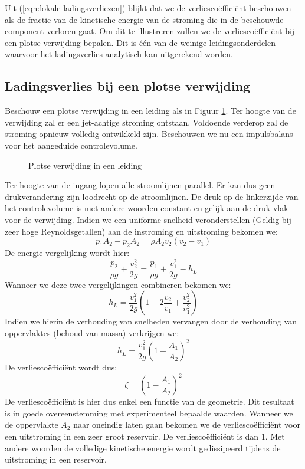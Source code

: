 Uit (\ref{eqn:lokale ladingsverliezen}) blijkt dat we de verliescoëfficiënt beschouwen als de fractie van de kinetische energie van de stroming die in de beschouwde component verloren gaat. Om dit te illustreren zullen we de verliescoëfficiënt bij een plotse verwijding bepalen. Dit is één van de weinige leidingsonderdelen waarvoor het ladingsverlies analytisch kan uitgerekend worden.

	\subsection{Ladingsverlies bij een plotse verwijding}
Beschouw een plotse verwijding in een leiding als in Figuur \ref{fig:Plotse verwijding}. Ter hoogte van de verwijding zal er een jet-achtige stroming ontstaan. Voldoende verderop zal de stroming opnieuw volledig ontwikkeld zijn. Beschouwen we nu een impulsbalans voor het aangeduide controlevolume.
\begin{figure}
	\centering
	
	\caption{Plotse verwijding in een leiding}
	\label{fig:Plotse verwijding}
\end{figure}
Ter hoogte van de ingang lopen alle stroomlijnen parallel. Er kan dus geen drukverandering zijn loodrecht op de stroomlijnen. De druk op de linkerzijde van het controlevolume is met andere woorden constant en gelijk aan de druk vlak voor de verwijding. Indien we een uniforme snelheid veronderstellen (Geldig bij zeer hoge Reynoldsgetallen) aan de instroming en uitstroming bekomen we:
\begin{equation}
	p_1 A_2 - p_2 A_2 = \rho A_2 v_2 (v_2-v_1)
\end{equation}
De energie vergelijking wordt hier:
\begin{equation}
	\frac{p_2}{\rho g} + \frac{v_2^2}{2 g} = \frac{p_1}{\rho g} + \frac{v_1^2}{2 g} - h_L
\end{equation}
Wanneer we deze twee vergelijkingen combineren bekomen we:
\begin{equation}
	h_L = \frac{v_1^2}{2 g} \left(1 - 2\frac{v_2}{v_1} + \frac{v_2^2}{v_1^2} \right)
\end{equation}
Indien we hierin de verhouding van snelheden vervangen door de verhouding van oppervlaktes (behoud van massa) verkrijgen we:
\begin{equation}
	h_L = \frac{v_1^2}{2 g} \left(1 - \frac{A_1}{A_2} \right)^2
\end{equation}
De verliescoëfficiënt wordt dus:
\begin{equation}
	\zeta = \left(1 - \frac{A_1}{A_2} \right)^2
\end{equation}
De verliescoëfficiënt is hier dus enkel een functie van de geometrie. Dit resultaat is in goede overeenstemming met experimenteel bepaalde waarden. Wanneer we de oppervlakte $A_2$ naar oneindig laten gaan bekomen we de verliescoëfficiënt voor een uitstroming in een zeer groot reservoir. De verliescoëfficiënt is dan 1. Met andere woorden de volledige kinetische energie wordt gedissipeerd tijdens de uitstroming in een reservoir.

